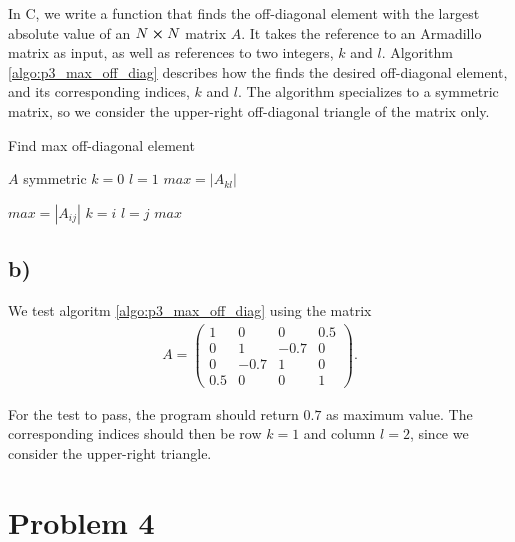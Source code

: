 \documentclass[english,notitlepage,nofootinbib]{revtex4-1}  %
\newcommand{\CC}{C\nolinebreak\hspace{-.05em}\raisebox{.4ex}{\tiny\bf +}\nolinebreak\hspace{-.10em}\raisebox{.4ex}{\tiny\bf +}}
\begin{document}
In \CC, we write a function that finds the off-diagonal element with the largest absolute value of an $N\cross N$ matrix $A$. It takes the reference to an Armadillo matrix as input, as well as references to two integers, $k$ and $l$. Algorithm \ref{algo:p3_max_off_diag} describes how the finds the desired off-diagonal element, and its corresponding indices, $k$ and $l$. The algorithm specializes to a symmetric matrix, so we consider the upper-right off-diagonal triangle of the matrix only.  

\begin{algorithm}[H]
\caption{Find max off-diagonal element}\label{algo:p3_max_off_diag}
    \begin{algorithmic}
        \Require $A$ symmetric
        \State $k=0$
        \State $l=1$
        \State $max = |A_{kl}|$ 
    
                \State $max = |A_{ij}|$
                \State $k=i$
                \State $l=j$
            \EndIf
        \EndFor
        \Return $max$
    \end{algorithmic}
\end{algorithm}

\subsection*{b)}

We test algoritm \ref{algo:p3_max_off_diag} using the matrix 
\begin{align*}
    A=\begin{pmatrix}
        1 & 0 & 0 & 0.5 \\
        0 & 1 & -0.7 & 0 \\
        0 & -0.7 & 1 & 0 \\
        0.5 & 0 & 0 & 1
    \end{pmatrix}.
\end{align*}

For the test to pass, the program should return $0.7$ as maximum value. The corresponding indices should then be row $k=1$ and column $l=2$, since we consider the upper-right triangle. 

\section*{Problem 4}
\end{document}
